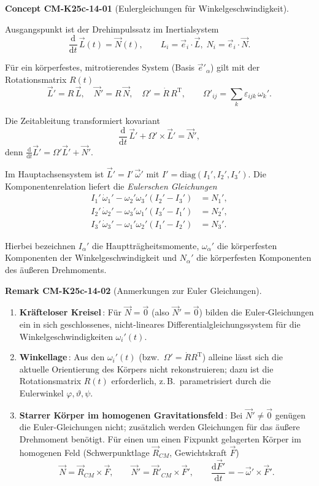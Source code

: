 \documentclass[10pt, letterpaper]{article}
\newcommand{\CustomHeading}[3]{%
  \par\medskip\noindent%
  \textbf{#1 #2} \textnormal{(#3)}.\enskip%
}
\newenvironment{REM}[2]{\CustomHeading{Remark}{#1}{#2}}{}
\newenvironment{CONC}[2]{\CustomHeading{Concept}{#1}{#2}}{}
\begin{document}
\begin{CONC}{CM-K25c-14-01}{Eulergleichungen für Winkelgeschwindigkeit}
Ausgangspunkt ist der Drehimpulssatz im Inertialsystem
\[
\frac{\mathrm d}{\mathrm dt}\,\vec L(t)=\vec N(t), 
\qquad 
L_i=\vec e_i\!\cdot\!\vec L,\;
N_i=\vec e_i\!\cdot\!\vec N .
\]

Für ein körperfestes, mitrotierendes System (Basis $\vec e'_\alpha$) gilt mit der Rotationsmatrix $R(t)$
\[
\vec L' = R\,\vec L,
\quad
\vec N' = R\,\vec N,
\quad
\Omega' = \dot R\,R^{\mathrm T},
\qquad 
\Omega'_{ij}=\sum_k\varepsilon_{ijk}\,\omega_k'.
\]

Die Zeitableitung transformiert kovariant
\[
\frac{\mathrm d}{\mathrm dt}\,\vec L' + \Omega'\!\times\!\vec L' = \vec N' ,
\]
denn 
\(
\frac{\mathrm d}{\mathrm dt}\vec L' = \Omega'\vec L' + \vec N'.
\)

Im Hauptachsensystem ist $\vec L' = I'\,\vec\omega'$ mit $I'=\mathrm{diag}(I_1',I_2',I_3')$.  Die Komponentenrelation liefert die \emph{Eulerschen Gleichungen}
\[
\boxed{
\begin{aligned}
I_1'\,\dot\omega_1' - \omega_2'\omega_3'(I_2'-I_3') &= N_1',\\
I_2'\,\dot\omega_2' - \omega_3'\omega_1'(I_3'-I_1') &= N_2',\\
I_3'\,\dot\omega_3' - \omega_1'\omega_2'(I_1'-I_2') &= N_3'.
\end{aligned}}
\]

Hierbei bezeichnen $I_\alpha'$ die Hauptträgheitsmomente, $\omega_\alpha'$ die körperfesten Komponenten der Winkelgeschwindigkeit und $N_\alpha'$ die körperfesten Komponenten des äußeren Drehmoments.
\end{CONC}

\begin{REM}{CM-K25c-14-02}{Anmerkungen zur Euler Gleichungen}
\begin{enumerate}
  \item \textbf{Kräfteloser Kreisel}\,: Für $\vec N = \vec 0$ (also $\vec N'=\vec 0$) bilden die Euler‐Gleichungen ein in sich geschlossenes, nicht-lineares Differentialgleichungssystem für die Winkelgeschwindigkeiten $\omega_i'(t)$.

  \item \textbf{Winkellage}\,: Aus den $\omega_i'(t)$ (bzw.\ $\Omega'=\dot R R^{\mathrm T}$) alleine lässt sich die aktuelle Orientierung des Körpers nicht rekonstruieren; dazu ist die Rotationsmatrix $R(t)$ erforderlich, z.\,B.\ parametrisiert durch die Eulerwinkel $\varphi,\vartheta,\psi$.

  \item \textbf{Starrer Körper im homogenen Gravitationsfeld}\,:  
        Bei $\vec N'\neq\vec 0$ genügen die Euler‐Gleichungen nicht; zusätzlich werden Gleichungen für das äußere Drehmoment benötigt.  
        Für einen um einen Fixpunkt gelagerten Körper im homogenen Feld (Schwerpunktlage $\vec R_{CM}$, Gewichtskraft $\vec F$)
        \[
          \vec N = \vec R_{CM}\times\vec F,
          \qquad
          \vec N' = \vec R'_{CM}\times\vec F',
          \qquad
          \frac{\mathrm d\vec F'}{\mathrm dt}
          = -\,\vec\omega'\times\vec F'.
        \]
\end{enumerate}
\end{REM}
\end{document}
